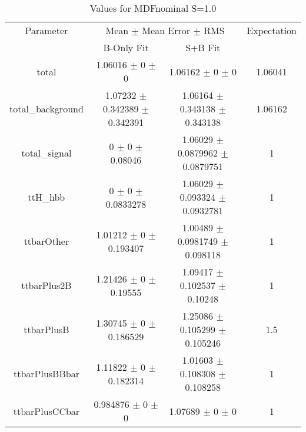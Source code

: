 \begin{table}
\centering
\caption{Values for MDFnominal S=1.0}
\begin{tabular}{cccc}
\toprule
Parameter & \multicolumn{2}{c}{Mean $\pm$ Mean Error $\pm$ RMS} & Expectation\\
 & B-Only Fit & S+B Fit & \\
\midrule
total & \num{1.06016} $\pm$ \num{0} $\pm$ \num{0} & \num{1.06162} $\pm$ \num{0} $\pm$ \num{0} & \num{1.06041}\\
total\_background & \num{1.07232} $\pm$ \num{0.342389} $\pm$ \num{0.342391} & \num{1.06164} $\pm$ \num{0.343138} $\pm$ \num{0.343138} & \num{1.06162}\\
total\_signal & \num{0} $\pm$ \num{0} $\pm$ \num{0.08046} & \num{1.06029} $\pm$ \num{0.0879962} $\pm$ \num{0.0879751} & \num{1}\\
ttH\_hbb & \num{0} $\pm$ \num{0} $\pm$ \num{0.0833278} & \num{1.06029} $\pm$ \num{0.093324} $\pm$ \num{0.0932781} & \num{1}\\
ttbarOther & \num{1.01212} $\pm$ \num{0} $\pm$ \num{0.193407} & \num{1.00489} $\pm$ \num{0.0981749} $\pm$ \num{0.098118} & \num{1}\\
ttbarPlus2B & \num{1.21426} $\pm$ \num{0} $\pm$ \num{0.19555} & \num{1.09417} $\pm$ \num{0.102537} $\pm$ \num{0.10248} & \num{1}\\
ttbarPlusB & \num{1.30745} $\pm$ \num{0} $\pm$ \num{0.186529} & \num{1.25086} $\pm$ \num{0.105299} $\pm$ \num{0.105246} & \num{1.5}\\
ttbarPlusBBbar & \num{1.11822} $\pm$ \num{0} $\pm$ \num{0.182314} & \num{1.01603} $\pm$ \num{0.108308} $\pm$ \num{0.108258} & \num{1}\\
ttbarPlusCCbar & \num{0.984876} $\pm$ \num{0} $\pm$ \num{0} & \num{1.07689} $\pm$ \num{0} $\pm$ \num{0} & \num{1}\\
\bottomrule
\end{tabular}
\end{table}